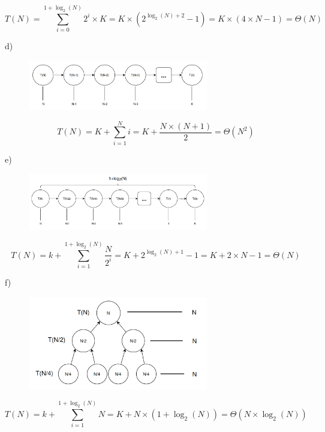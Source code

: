 \documentclass[a4paper,11pt]{article}
\begin{document}
	\[
		T(N) = \sum_{i=0}^{1 + \log_2(N)} 2^i \times K = K \times (2^{\log_2(N) + 2} - 1) = K \times (4 \times N - 1) = \Theta(N)
	\]
	
	\noindent d)
	
	\begin{figure}[h]
		\centering
		\includegraphics[width=0.7\textwidth]{imgs/2_1-d}
		\label{fig:2_1-d}
	\end{figure}
	
	\[
		T(N) = K + \sum_{i=1}^{N} i = K + \frac{N \times (N + 1)}{2} = \Theta(N^2)
	\]
	
	\noindent e)
	
	\begin{figure}[h]
		\centering
		\includegraphics[width=0.7\textwidth]{imgs/2_1-e}
		\label{fig:2_1-e}
	\end{figure}
	
	\[
		T(N) = k + \sum_{i=1}^{1 + \log_2(N)} \frac{N}{2^i} = K + 2^{\log_2(N) + 1} - 1 = K + 2 \times N - 1 = \Theta(N)
	\]
	
	\noindent f)
	
	\begin{figure}[h]
		\centering
		\includegraphics[width=0.7\textwidth]{imgs/2_1-f}
		\label{fig:2_1-f}
	\end{figure}
	
	\[
		T(N) = k + \sum_{i=1}^{1 + \log_2(N)} N = K + N \times (1 + \log_2(N)) = \Theta(N \times \log_2(N))
	\]
	
\end{document}
